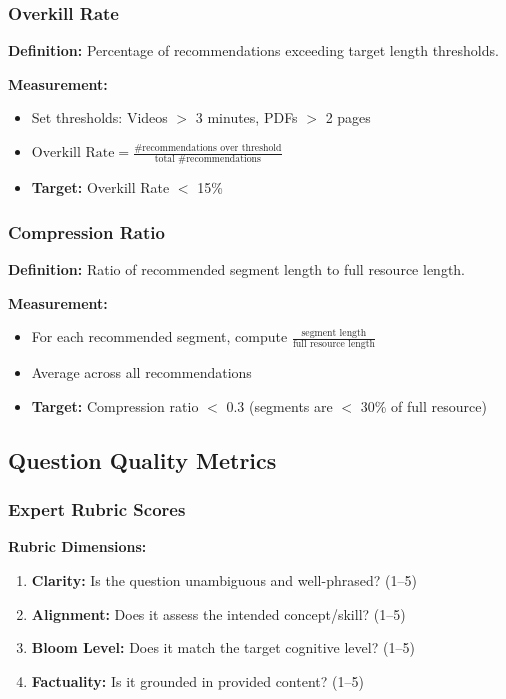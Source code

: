 \documentclass[11pt,letterpaper]{article}
\begin{document}
\subsubsection{Overkill Rate}

\textbf{Definition:} Percentage of recommendations exceeding target length thresholds.

\textbf{Measurement:}
\begin{itemize}
\item Set thresholds: Videos $>$ 3 minutes, PDFs $>$ 2 pages
\item $\text{Overkill Rate} = \frac{\text{\# recommendations over threshold}}{\text{total \# recommendations}}$
\item \textbf{Target:} Overkill Rate $<$ 15\%
\end{itemize}

\subsubsection{Compression Ratio}

\textbf{Definition:} Ratio of recommended segment length to full resource length.

\textbf{Measurement:}
\begin{itemize}
\item For each recommended segment, compute $\frac{\text{segment length}}{\text{full resource length}}$
\item Average across all recommendations
\item \textbf{Target:} Compression ratio $<$ 0.3 (segments are $<$ 30\% of full resource)
\end{itemize}

\subsection{Question Quality Metrics}

\subsubsection{Expert Rubric Scores}

\textbf{Rubric Dimensions:}
\begin{enumerate}
\item \textbf{Clarity:} Is the question unambiguous and well-phrased? (1--5)
\item \textbf{Alignment:} Does it assess the intended concept/skill? (1--5)
\item \textbf{Bloom Level:} Does it match the target cognitive level? (1--5)
\item \textbf{Factuality:} Is it grounded in provided content? (1--5)
\end{enumerate}
\end{document}
